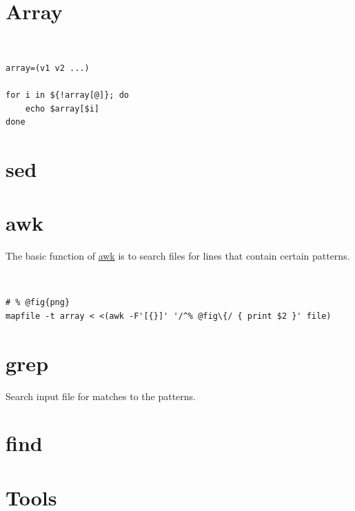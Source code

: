 \documentclass{blog}
\begin{document}
\section{Array}
\begin{definition}[array]~
    \begin{verbatim}
array=(v1 v2 ...)

for i in ${!array[@]}; do
    echo $array[$i]
done
\end{verbatim}
\end{definition}

\section{sed}

\section{awk}
\begin{definition}[awk]
    The basic function of \href{https://www.gnu.org/software/gawk/manual/gawk.html}{awk}
    is to search files for lines that contain certain patterns.
\end{definition}

\begin{example}~
    \begin{verbatim}
# % @fig{png}
mapfile -t array < <(awk -F'[{}]' '/^% @fig\{/ { print $2 }' file)
\end{verbatim}
\end{example}

\section{grep}
\begin{definition}[grep]
    Search input file for matches to the patterns.
\end{definition}

\section{find}

\appendix
\section{Tools}

\printbibliography
\end{document}
